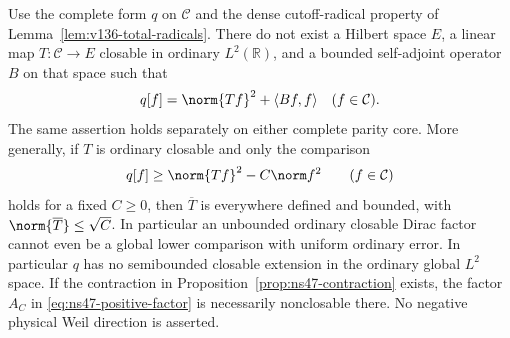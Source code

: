 \begin{proposition}
\label{prop:ns47-no-closed-square}
Use the complete form $q$ on $\mathcal C$ and the dense cutoff-radical
property of Lemma~\ref{lem:v136-total-radicals}. There do not exist
a Hilbert space $E$, a linear map $T:\mathcal C\to E$ closable
in ordinary $L^2(\mathbb R)$, and a bounded self-adjoint operator
$B$ on that space such that
\begin{equation}\label{eq:ns47-forbidden-square}
 q[f]=\norm{Tf}^2+\langle Bf,f\rangle
 \quad(f\in\mathcal C).
\end{equation}
The same assertion holds separately on either complete parity core.
More generally, if $T$ is ordinary closable and only the comparison
\begin{equation}\label{eq:ns47-lower-comparison}
 q[f]\ge\norm{Tf}^2-C\norm f^2\qquad(f\in\mathcal C)
\end{equation}
holds for a fixed $C\ge0$, then $\overline T$ is everywhere defined
and bounded, with $\norm{\overline T}\le\sqrt C$. In particular an
unbounded ordinary closable Dirac factor cannot even be a global
lower comparison with uniform ordinary error.
In particular $q$ has no semibounded closable extension in the ordinary
global $L^2$ space. If the contraction in
Proposition~\ref{prop:ns47-contraction} exists, the factor $A_C$ in
\eqref{eq:ns47-positive-factor} is necessarily nonclosable there.
No negative physical Weil direction is asserted.
\end{proposition}
